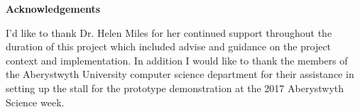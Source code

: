 \thispagestyle{empty}

\begin{center}
    {\LARGE\bf Acknowledgements}
\end{center}

I'd like to thank Dr. Helen Miles for her continued support throughout the duration of this project which included advise and guidance on the project context and implementation. In addition I would like to thank the members of the Aberystwyth University computer science department for their assistance in setting up the stall for the prototype demonstration at the 2017 Aberystwyth Science week.
